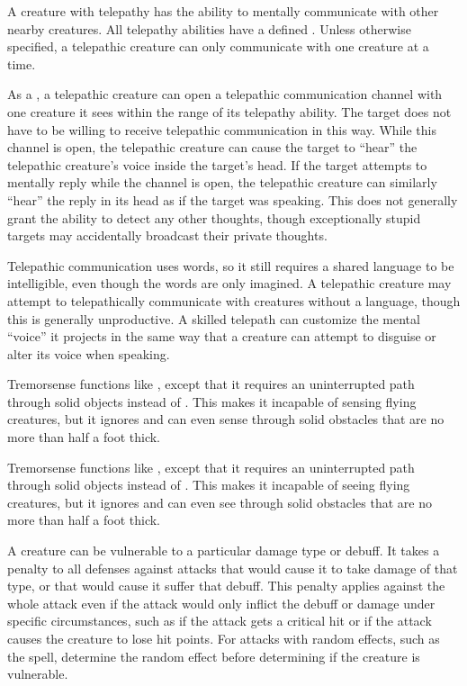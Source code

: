         A creature with telepathy has the ability to mentally communicate with other nearby creatures.
        All telepathy abilities have a defined .
        Unless otherwise specified, a telepathic creature can only communicate with one creature at a time.

        As a , a telepathic creature can open a telepathic communication channel with one creature it sees within the range of its telepathy ability.
        The target does not have to be willing to receive telepathic communication in this way.
        While this channel is open, the telepathic creature can cause the target to ``hear'' the telepathic creature's voice inside the target's head.
        If the target attempts to mentally reply while the channel is open, the telepathic creature can similarly ``hear'' the reply in its head as if the target was speaking.
        This does not generally grant the ability to detect any other thoughts, though exceptionally stupid targets may accidentally broadcast their private thoughts.

        Telepathic communication uses words, so it still requires a shared language to be intelligible, even though the words are only imagined.
        A telepathic creature may attempt to telepathically communicate with creatures without a language, though this is generally unproductive.
        A skilled telepath can customize the mental ``voice'' it projects in the same way that a creature can attempt to disguise or alter its voice when speaking.

        Tremorsense functions like , except that it requires an uninterrupted path through solid objects instead of .
        This makes it incapable of sensing flying creatures, but it ignores  and can even sense through solid obstacles that are no more than half a foot thick.

        Tremorsense functions like , except that it requires an uninterrupted path through solid objects instead of .
        This makes it incapable of seeing flying creatures, but it ignores  and can even see through solid obstacles that are no more than half a foot thick.

        A creature can be vulnerable to a particular damage type or debuff.
        It takes a  penalty to all defenses against attacks that would cause it to take damage of that type, or that would cause it suffer that debuff.
        This penalty applies against the whole attack even if the attack would only inflict the debuff or damage under specific circumstances, such as if the attack gets a critical hit or if the attack causes the creature to lose hit points.
        For attacks with random effects, such as the  spell, determine the random effect before determining if the creature is vulnerable.


